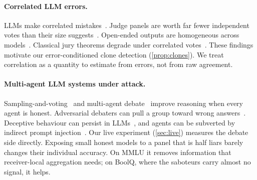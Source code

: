 \paragraph{Correlated LLM errors.} LLMs make correlated mistakes~\citep{kim2025correlated}. Judge panels are worth far fewer independent votes than their size suggests~\citep{kohli2026,verga2024juries,zheng2023judge}. Open-ended outputs are homogeneous across models~\citep{jiang2025hivemind}. Classical jury theorems degrade under correlated votes~\citep{ladha1992}. These findings motivate our error-conditioned clone detection (\cref{prop:clones}). We treat correlation as a quantity to estimate from errors, not from raw agreement.

\paragraph{Multi-agent LLM systems under attack.} Sampling-and-voting~\citep{wang2023sc} and multi-agent debate~\citep{du2024debate} improve reasoning when every agent is honest. Adversarial debaters can pull a group toward wrong answers~\citep{amayuelas2024}. Deceptive behaviour can persist in LLMs~\citep{hubinger2024sleeper,park2024deception}, and agents can be subverted by indirect prompt injection~\citep{greshake2023}. Our live experiment (\cref{sec:live}) measures the debate side directly. Exposing small honest models to a panel that is half liars barely changes their individual accuracy. On MMLU it removes information that receiver-local aggregation needs; on BoolQ, where the saboteurs carry almost no signal, it helps.

